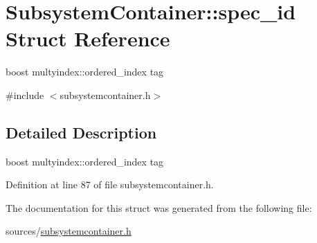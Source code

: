 \hypertarget{structSubsystemContainer_1_1spec__id}{
\section{SubsystemContainer::spec\_\-id Struct Reference}
\label{structSubsystemContainer_1_1spec__id}
}


boost multyindex::ordered\_\-index tag  




{\ttfamily \#include $<$subsystemcontainer.h$>$}



\subsection{Detailed Description}
boost multyindex::ordered\_\-index tag 

Definition at line 87 of file subsystemcontainer.h.



The documentation for this struct was generated from the following file:\begin{DoxyCompactItemize}
\item 
sources/\hyperlink{subsystemcontainer_8h}{subsystemcontainer.h}\end{DoxyCompactItemize}

